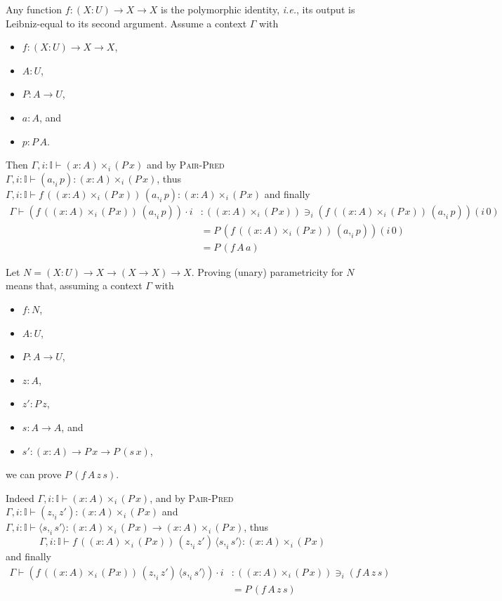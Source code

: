 \documentclass[english]{PaperTools/latex/lipics}
\newcommand\CP[3]{(#2,_{#1} #3)}
\newcommand\CTimes[2]{(#2) ×_{#1}}
\newcommand\param[1]{\!\cdot\!#1}
\newcommand\op[1]{∋_{#1}}
\newcommand\fp[3]{⟨#2 ,_{#1} #3⟩}
\newcommand\mor[2]{({#1}\,{#2})}
\newcommand\proj[2]{{#2}\mor{#1}0}
\def\ie{\textit{i.e.}}
\begin{document}
\begin{example}
  \label{ex:poly-id}
  Any function $f : (X : U) → X → X$ is the polymorphic identity, \ie,
  its output is Leibniz-equal to its second argument.
  Assume a context $Γ$ with
  \begin{itemize}
    \item $f : (X : U) → X → X$,
    \item $A : U$,
    \item $P : A → U$,
    \item $a : A$, and
    \item $p : P\, A$.
  \end{itemize}
  Then
  $Γ, i:𝕀⊢\CTimes i {x:A} {(P\,x)}$
  and by \textsc{Pair-Pred}
  $Γ, i:𝕀⊢\CP i a p : \CTimes i {x:A} {(P\,x)}$, thus
  $Γ, i:𝕀⊢f\, (\CTimes i {x:A} {(P\,x)})\, {\CP i a p} : \CTimes i {x:A} {(P\,x)}$
  and finally
  \begin{align*}
   Γ ⊢(f\, (\CTimes i {x:A} {(P\,x)})\, {\CP i a p}) \param i
   &: (\CTimes i {x:A} {(P\,x)}) \op i \proj i {(f\, (\CTimes i {x:A} {(P\,x)})\, {\CP i a p})} \\
   &= P\, \proj i {(f\, (\CTimes i {x:A} {(P\,x)})\, {\CP i a p})} \\
   &= P\, (f\, A\, a)
  \end{align*}
\end{example}

\begin{example}
  \label{ex:church-nat}
Let $N = (X : U) → X → (X → X) → X$.
Proving (unary) parametricity for $N$ means that, assuming a context $Γ$ with
\begin{itemize}
\item $f : N$,
\item $A : U$,
\item $P : A → U$,
\item $z : A$,
\item $z' : P\, z$,
\item $s : A → A$, and
\item $s' : (x:A) → P\, x → P\, (s\, x)$,
\end{itemize}
we can prove $P\, (f\, A\, z\, s)$.

Indeed
  $Γ, i:𝕀⊢\CTimes i {x:A} {(P\,x)}$,
  and by \textsc{Pair-Pred}
  $Γ, i:𝕀⊢ \CP i z {z'} : \CTimes i {x:A} {(P\,x)}$ and
  $Γ, i:𝕀⊢ \fp i s {s'} : \CTimes i {x:A} {(P\,x)} → \CTimes i {x:A} {(P\,x)}$,
thus
  $$Γ, i:𝕀 ⊢ f\, (\CTimes i {x:A} {(P\,x)})\, {\CP i z {z'}}\, \fp i s {s'} : \CTimes i {x:A} {(P\,x)}$$
  and finally
  \begin{align*}
    Γ ⊢ (f\, (\CTimes i {x:A} {(P\,x)})\, {\CP i z {z'}}\, \fp i s {s'}) \param i
     &: (\CTimes i {x:A} {(P\,x)}) \op i (f\, A\, z\, s) \\
     &= P\, (f\, A\, z\, s) \\
  \end{align*}
\end{example}
\end{document}
